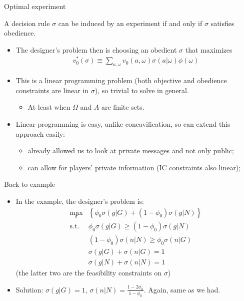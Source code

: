 \documentclass[english,10pt
,aspectratio=169
]{beamer}
\begin{document}
\begin{frame}{Optimal experiment}
\begin{theorem}
	A decision rule $\sigma$ can be induced by an experiment if and only if $\sigma$ satisfies obedience.
\end{theorem}
\begin{itemize}
	\item The designer's problem then is choosing an obedient $\sigma$ that maximizes
	\begin{align*}
		v_0^* (\sigma) \equiv  \sum_{a,\omega} v_0(a,\omega) \sigma (a | \omega) \phi(\omega)
	\end{align*}
	\item This is a linear programming problem (both objective and obedience constraints are linear in $\sigma$), so trivial to solve in general.
	\begin{itemize}
		\item At least when $\Omega$ and $A$ are finite sets.
	\end{itemize}
	\item Linear programming is easy, unlike concavification, so can extend this approach easily:
	\begin{itemize}
		\item already allowed us to look at private messages and not only public;
		\item can allow for players' private information (IC constraints also linear);
	\end{itemize}
\end{itemize}
\end{frame}


\begin{frame}{Back to example}
\begin{itemize}
	\item In the example, the designer's problem is:
	\begin{align*}
		\max_{\sigma} & \left\{ \phi_0 \sigma(g|G) + (1-\phi_0) \sigma(g|N) \right\}
		\\
		\text{s.t. } & \phi_0 \sigma(g|G) \geq (1-\phi_0) \sigma(g|N)
		\\
		&	(1-\phi_0) \sigma(n|N) \geq \phi_0 \sigma(n|G)
		\\
		&	\sigma(g|G) + \sigma(n|G) = 1
		\\
		&	\sigma(g|N) + \sigma(n|N) = 1
	\end{align*}
	(the latter two are the feasibility constraints on $\sigma$)
	
	\item Solution: $\sigma(g|G) = 1$, $\sigma(n|N) = \frac{1-2\phi_0}{1-\phi_0}$. Again, same as we had.
\end{itemize}
\end{frame}
\end{document}
